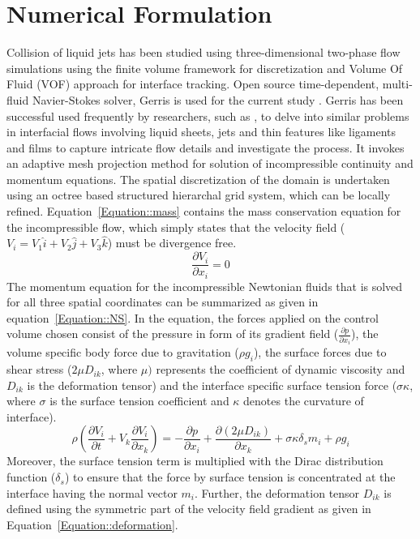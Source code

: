 \documentclass[%
aip,
sd,%
amsmath,amssymb,
preprint,%
author-year,%
]{revtex4-1}
\begin{document}
\section{Numerical Formulation}\label{Section::Numerical}
Collision of liquid jets has been studied using three-dimensional two-phase flow simulations using the finite volume framework for discretization and Volume Of Fluid (VOF) approach for interface tracking. Open source time-dependent, multi-fluid Navier-Stokes solver, Gerris is used for the current study \citep{Popinet2003}. Gerris has been successful used frequently by researchers, such as \cite{chen2013high,kumar2016physical,kumar2017bending}, to delve into similar problems in interfacial flows involving liquid sheets, jets and thin features like ligaments and films to capture intricate flow details and investigate the process. It invokes an adaptive mesh projection method for solution of incompressible continuity and momentum equations. The spatial discretization of the domain is undertaken using an octree based structured hierarchal grid system, which can be locally refined. Equation~\ref{Equation::mass} contains the mass conservation equation for the incompressible flow, which simply states that the velocity field ($V_i = V_1\hat{i} + V_2\hat{j} + V_3\hat{k}$) must be divergence free.   
\begin{equation} \label{Equation::mass}
\frac{\partial V_i}{\partial x_i} = 0
\end{equation}
The momentum equation for the incompressible Newtonian fluids that is solved for all three spatial coordinates can be summarized as given in equation~\ref{Equation::NS}. In the equation, the forces applied on the control volume chosen consist of the pressure in form of its gradient field ($\frac{\partial p}{\partial x_i}$), the volume specific body force due to gravitation ($\rho g_i$), the surface forces due to shear stress ($2\mu D_{ik}$, where $\mu)$ represents the coefficient of dynamic viscosity and $D_{ik}$ is the deformation tensor) and the interface specific surface tension force ($\sigma \kappa$, where $\sigma$ is the surface tension coefficient and $\kappa$ denotes the curvature of interface). 
\begin{equation} \label{Equation::NS}
\rho\left( \frac{\partial V_i}{\partial t} + V_k\frac{\partial V_i}{\partial x_k} \right) = -\frac{\partial p}{\partial x_i} + \frac{\partial (2\mu D_{ik})}{\partial x_k} + \sigma \kappa \delta_sm_i + \rho g_i
\end{equation}
Moreover, the surface tension term is multiplied with the Dirac distribution function ($\delta_s$) to ensure that the force by surface tension is concentrated at the interface having the normal vector $m_i$. Further, the deformation tensor $D_{ik}$ is defined using the symmetric part of the velocity field gradient as given in Equation~\ref{Equation::deformation}.
\end{document}
